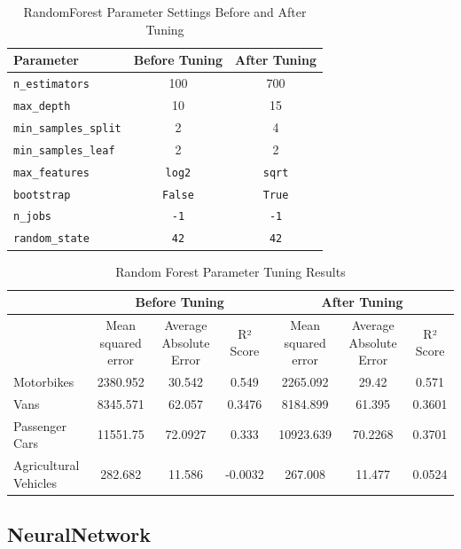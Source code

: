\documentclass{llncs}
\begin{document}
\begin{table}[h!]
    \centering
    \begin{tabular}{l|cc}
        \hline
        Parameter & Before Tuning & After Tuning \\
        \hline
        \texttt{n\_estimators} & 100 & 700 \\
        \texttt{max\_depth} & 10 & 15 \\
        \texttt{min\_samples\_split} & 2 & 4 \\
        \texttt{min\_samples\_leaf} & 2 & 2 \\
        \texttt{max\_features} & \texttt{log2} & \texttt{sqrt} \\
        \texttt{bootstrap} & \texttt{False} & \texttt{True} \\
        \texttt{n\_jobs} & \texttt{-1} & \texttt{-1} \\
        \texttt{random\_state} & \texttt{42} & \texttt{42} \\
        \hline
    \end{tabular}
    \caption{RandomForest Parameter Settings Before and After Tuning}
\end{table}

\begin{table}[h!]
    \centering
    \begin{tabular}{lccc|ccc}
        \hline
        & \multicolumn{3}{c}{Before Tuning} & \multicolumn{3}{c}{After Tuning} \\
        \hline
        & Mean squared error & Average Absolute Error & R² Score & Mean squared error & Average Absolute Error & R² Score \\
        \hline
        Motorbikes & 2380.952 & 30.542 & 0.549 & 2265.092 & 29.42 & 0.571 \\
        Vans & 8345.571 & 62.057 & 0.3476 & 8184.899 & 61.395 & 0.3601 \\
        Passenger Cars & 11551.75 & 72.0927 & 0.333 & 10923.639 & 70.2268 & 0.3701 \\
        Agricultural Vehicles & 282.682 & 11.586 & -0.0032 & 267.008 & 11.477 & 0.0524 \\
        \hline
    \end{tabular}
    \caption{Random Forest Parameter Tuning Results}
\end{table}

\subsection{NeuralNetwork}
\end{document}
